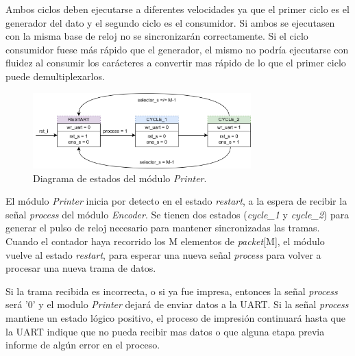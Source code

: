 	Ambos ciclos deben ejecutarse a diferentes velocidades ya que el primer ciclo es el generador del dato y el segundo ciclo es el consumidor. Si ambos se ejecutasen con la misma base de reloj no se sincronizarán correctamente. Si el ciclo consumidor fuese más rápido que el generador, el mismo no podría ejecutarse con fluidez al consumir los carácteres a convertir mas rápido de lo que el primer ciclo puede demultiplexarlos.
	
	\begin{figure}[H]
		\centering
		\includegraphics[width=0.75\textwidth]{Figuras/Printer_FSMD.png}
		\centering\caption{Diagrama de estados del módulo \textit{Printer}.}
		\label{fig:Printer_FSMD}
	\end{figure}
	
	El módulo \textit{Printer} inicia por detecto en el estado \textit{restart}, a la espera de recibir la señal \textit{process} del módulo \textit{Encoder}. Se tienen dos estados (\textit{cycle\_1} y \textit{cycle\_2}) para generar el pulso de reloj necesario para mantener sincronizadas las tramas. Cuando el contador haya recorrido los M elementos de \textit{packet}[M], el módulo vuelve al estado \textit{restart}, para esperar una nueva señal \textit{process} para volver a procesar una nueva trama de datos.
	
	Si la trama recibida es incorrecta, o si ya fue impresa, entonces la señal \textit{process} será '0' y el modulo \textit{Printer} dejará de enviar datos a la UART. Si la señal \textit{process} mantiene un estado lógico positivo, el proceso de impresión continuará hasta que la UART indique que no pueda recibir mas datos o que alguna etapa previa informe de algún error en el proceso.